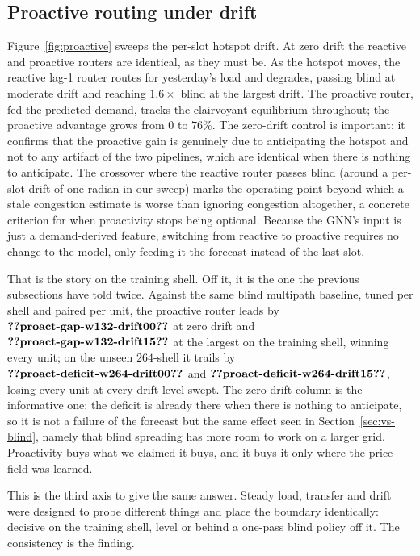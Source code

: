 \documentclass[journal]{IEEEtran}
\begin{document}
\subsection{Proactive routing under drift}
Figure~\ref{fig:proactive} sweeps the per-slot hotspot drift. At zero drift the reactive
and proactive routers are identical, as they must be. As the hotspot moves, the reactive
lag-1 router routes for yesterday's load and degrades, passing blind at moderate drift
and reaching $1.6\times$ blind at the largest drift. The proactive router, fed the
predicted demand, tracks the clairvoyant equilibrium throughout; the proactive advantage
grows from $0$ to $76\%$. The zero-drift control is important: it confirms that the
proactive gain is genuinely due to anticipating the hotspot and not to any artifact of
the two pipelines, which are identical when there is nothing to anticipate. The crossover
where the reactive router passes blind (around a per-slot drift of one radian in our
sweep) marks the operating point beyond which a stale congestion estimate is worse than
ignoring congestion altogether, a concrete criterion for when proactivity stops being optional. Because the GNN's input is just a demand-derived feature, switching from
reactive to proactive requires no change to the model, only feeding it the forecast
instead of the last slot.

That is the story on the training shell. Off it, it is the one the previous subsections have told twice. Against the same blind multipath baseline, tuned per shell and paired per unit, the proactive router leads by $\clm{proact-gap-w132-drift00}$ at zero drift and $\clm{proact-gap-w132-drift15}$ at the largest on the training shell, winning every unit; on the unseen $264$-shell it trails by $\clm{proact-deficit-w264-drift00}$ and $\clm{proact-deficit-w264-drift15}$, losing every unit at every drift level swept. The zero-drift column is the informative one: the deficit is already there when there is
nothing to anticipate, so it is not a failure of the forecast but the same effect seen in
Section~\ref{sec:vs-blind}, namely that blind spreading has more room to work on a larger grid.
Proactivity buys what we claimed it buys, and it buys it only where the price field was learned.

This is the third axis to give the same answer. Steady load, transfer and drift were designed to probe different things and place the boundary identically: decisive on the training shell, level or behind a one-pass blind policy off it. The consistency is the finding.
\end{document}
